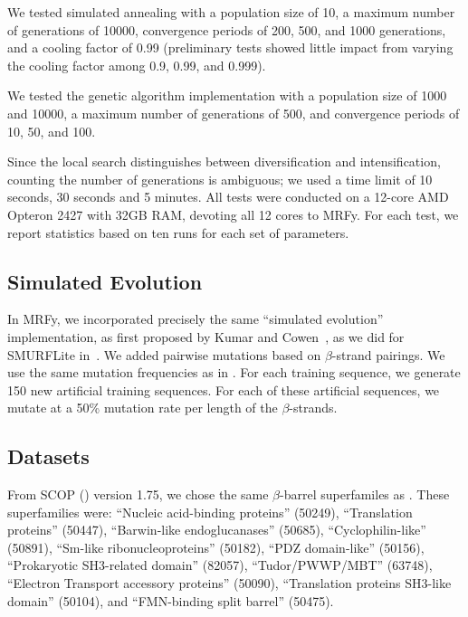 \documentclass{acm_proc_article-sp}
\begin{document}
We tested simulated annealing with a population size of 10, a maximum number of
generations of 10000, convergence periods of 200, 500, and 1000 generations, 
and a cooling factor of 0.99 (preliminary tests showed little impact from
varying the cooling factor among 0.9, 0.99, and 0.999).

We tested the genetic algorithm implementation with a population size of 1000 
and 10000, a maximum number of generations of 500, and convergence
periods of 10, 50, and 100.

Since the local search distinguishes between diversification and 
intensification, counting the number of generations is ambiguous; we used a time
limit of 10 seconds, 30 seconds and 5 minutes.
All tests were conducted on a 12-core AMD Opteron 2427 with 32GB RAM, devoting 
all 12 cores to MRFy.
For each test, we report statistics based on ten runs for each set of 
parameters.

\subsection{Simulated Evolution} \label{mrfy-simev}

In MRFy, we incorporated precisely the same ``simulated evolution'' 
implementation, as first proposed by Kumar and 
Cowen~\cite{Kumar:2009tp, Kumar:2010wv}, as we did for SMURFLite
in~\cite{Daniels:2012dg}.
We added pairwise mutations based on $\beta$-strand pairings.
We use the same mutation frequencies as in \citet{Daniels:2012dg}.
For each training sequence, we generate 150 new artificial training 
sequences. 
For each of these artificial sequences, we mutate at a 50\% mutation rate per 
length of the $\beta$-strands.

\subsection{Datasets} \label{mrfy-datasets}

From SCOP (\cite{Murzin:1995uh}) version 1.75, we chose the same
$\beta$-barrel superfamiles as \citet{Daniels:2012dg}.
These superfamilies were: ``Nucleic acid-binding proteins'' (50249), 
``Translation proteins'' (50447), 
``Barwin-like endoglucanases'' (50685), ``Cyclophilin-like'' (50891), ``Sm-like 
ribonucleoproteins'' (50182), ``PDZ domain-like'' (50156), ``Prokaryotic 
SH3-related domain'' (82057), ``Tudor/PWWP/MBT'' (63748), ``Electron Transport 
accessory proteins'' (50090), ``Translation proteins SH3-like domain'' (50104), 
and ``FMN-binding split barrel'' (50475). 
\end{document}
